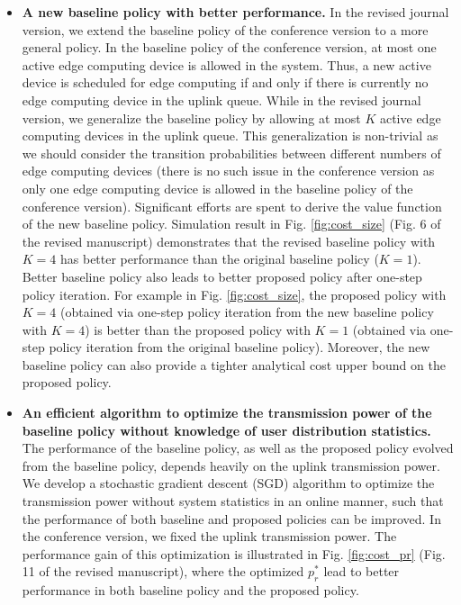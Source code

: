 \documentclass[12pt,onecolumn]{IEEEtran}
\begin{document}
{\begin{itemize}
	\item \textbf{A new baseline policy with better performance.} In the revised journal version, we extend the baseline policy of the conference version to a more general policy. In the baseline policy of the conference version, at most one active edge computing device is allowed in the system. Thus, a new active device is scheduled for edge computing if and only if there is currently no edge computing device in the uplink queue. While in the revised journal version, we generalize the baseline policy by allowing at most $K$ active edge computing devices in the uplink queue. This generalization is non-trivial as we should consider the transition probabilities between different numbers of edge computing devices (there is no such issue in the conference version as only one edge computing device is allowed in the baseline policy of the conference version). Significant efforts are spent to derive the value function of the new baseline policy. Simulation result in Fig. \ref{fig:cost_size} (Fig. 6 of the revised manuscript) demonstrates that the revised baseline policy with $K=4$ has better performance than the original baseline policy ($K=1$). Better baseline policy also leads to better proposed policy after one-step policy iteration. For example in Fig. \ref{fig:cost_size}, the proposed policy with $K=4$ (obtained via one-step policy iteration from the new baseline policy with $K=4$) is better than the proposed policy with $K=1$ (obtained via one-step policy iteration from the original baseline policy). Moreover, the new baseline policy can also provide a tighter analytical cost upper bound on the proposed policy.
	
	
	
	\item \textbf{An efficient algorithm to optimize the transmission power of the baseline policy without knowledge of user distribution statistics.} The performance of the baseline policy,  as well as the proposed policy evolved from the baseline policy,  depends heavily on the uplink transmission power. We develop a stochastic gradient descent (SGD) algorithm to optimize the transmission power without system statistics in an online manner, such that the performance of both baseline and proposed policies can be improved. In the conference version, we fixed the uplink transmission power. The performance gain of this optimization is illustrated in Fig. \ref{fig:cost_pr} (Fig. 11 of the revised manuscript), where the optimized $p_r^*$ lead to better performance in both baseline policy and the proposed policy.
	

\end{itemize}}
\end{document}
